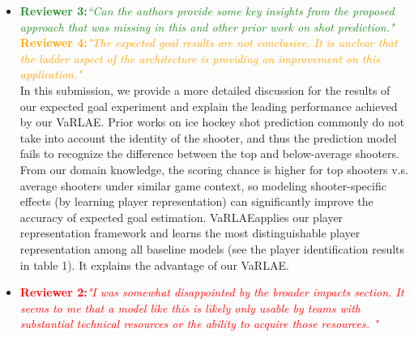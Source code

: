 \documentclass[letterpaper]{article} %
\newcommand{\system}{VaRLAE\;}
\begin{document}
\begin{itemize}

\item \textcolor{ForestGreen}{\bf Reviewer 3:}\textcolor{ForestGreen}{\it “Can the authors provide some key insights from the proposed approach that was missing in this and other prior work on shot prediction."}\\
\textcolor{orange}{\bf Reviewer 4:}\textcolor{orange}{\it "The expected goal results are not conclusive. It is unclear that the ladder aspect of the architecture is providing an improvement on this application."}\\
In this submission, we provide a more detailed discussion for the results of our expected goal experiment and explain the leading performance achieved by our \system.  
Prior works on ice hockey shot prediction commonly do not take into account the identity of the shooter, and thus the prediction model fails to recognize the difference between the top and below-average shooters.
From our domain knowledge, the scoring chance is higher for top shooters v.s. average shooters under similar game context, so modeling shooter-specific effects (by learning player representation) can significantly improve the accuracy of expected goal estimation. 
\system applies our player representation framework and learns the most distinguishable player representation among all baseline models (see the player identification results in table 1). It explains the advantage of our \system.
\item \textcolor{Red}{\bf Reviewer 2:}\textcolor{Red}{\it "I was somewhat disappointed by the broader impacts section. It seems to me that a model like this is likely only usable by teams with substantial technical resources or the ability to acquire those resources. "}\\

\end{itemize}
\end{document}

